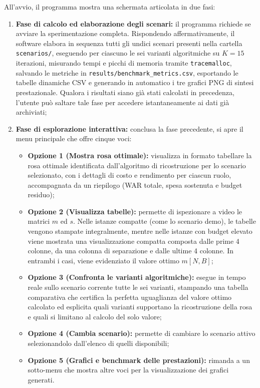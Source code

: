 All'avvio, il programma mostra una schermata articolata in due fasi:
\begin{enumerate}
	\item \textbf{Fase di calcolo ed elaborazione degli scenari:} il programma richiede se avviare la sperimentazione completa. Rispondendo affermativamente, il software elabora in sequenza tutti gli undici scenari presenti nella cartella \texttt{scenarios/}, eseguendo per ciascuno le sei varianti algoritmiche su $K = 15$ iterazioni, misurando tempi e picchi di memoria tramite \texttt{tracemalloc}, salvando le metriche in \texttt{results/benchmark\_metrics.csv}, esportando le tabelle dinamiche CSV e generando in automatico i tre grafici PNG di sintesi prestazionale. Qualora i risultati siano già stati calcolati in precedenza, l'utente può saltare tale fase per accedere istantaneamente ai dati già archiviati;
	\item \textbf{Fase di esplorazione interattiva:} conclusa la fase precedente, si apre il menu principale che offre cinque voci:
	\begin{itemize}
		\item \textbf{Opzione 1 (Mostra rosa ottimale):} visualizza in formato tabellare la rosa ottimale identificata dall'algoritmo di ricostruzione per lo scenario selezionato, con i dettagli di costo e rendimento per ciascun ruolo, accompagnata da un riepilogo (WAR totale, spesa sostenuta e budget residuo);
		\item \textbf{Opzione 2 (Visualizza tabelle):} permette di ispezionare a video le matrici $m$ ed $s$. Nelle istanze compatte (come lo scenario demo), le tabelle vengono stampate integralmente, mentre nelle istanze con budget elevato viene mostrata una visualizzazione compatta composta dalle prime 4 colonne, da una colonna di separazione e dalle ultime 4 colonne. In entrambi i casi, viene evidenziato il valore ottimo $m[N, B]$;
		\item \textbf{Opzione 3 (Confronta le varianti algoritmiche):} esegue in tempo reale sullo scenario corrente tutte le sei varianti, stampando una tabella comparativa che certifica la perfetta uguaglianza del valore ottimo calcolato ed esplicita quali varianti supportano la ricostruzione della rosa e quali si limitano al calcolo del solo valore;
		\item \textbf{Opzione 4 (Cambia scenario):} permette di cambiare lo scenario attivo selezionandolo dall'elenco di quelli disponibili;
		\item \textbf{Opzione 5 (Grafici e benchmark delle prestazioni):} rimanda a un sotto-menu che mostra altre voci per la visualizzazione dei grafici generati.
	\end{itemize}
\end{enumerate}

